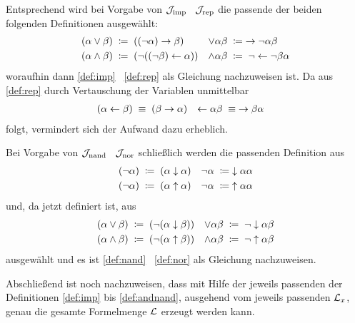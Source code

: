 Entsprechend wird bei Vorgabe von $\mathcal{J}_{\mathrm{imp}}$ \textbzgl\ $\mathcal{J}_{\mathrm{rep}}$ die passende der beiden folgenden Definitionen ausgewählt:
\begin{align}
	(\alpha \lor  \beta) & \;\coloneqq\; ((\lnot \alpha) \rightarrow \beta)         &
	\lor \alpha   \beta  & \;\coloneqq\;   \rightarrow \lnot \alpha \beta
	\label{def:orrep}
	\\
	(\alpha \land \beta) & \;\coloneqq\; (\lnot ((\lnot \beta) \leftarrow \alpha)) &
	\land \alpha  \beta  & \;\coloneqq\;  \lnot \leftarrow \lnot \beta \alpha
	\label{def:andrep}
\end{align}
woraufhin dann \eqref{def:imp} \textbzgl\ \eqref{def:rep} als Gleichung nachzuweisen ist.
Da aus \eqref{def:rep} durch Vertauschung der Variablen unmittelbar
\begin{align}
	(\alpha \leftarrow \beta) & \;\equiv\; (\beta \rightarrow \alpha) &
	\leftarrow \alpha  \beta  & \;\equiv\;  \rightarrow \beta \alpha  \label{eq:repimp}
\end{align}
folgt, vermindert sich der Aufwand dazu erheblich.

Bei Vorgabe von $\mathcal{J}_{\mathrm{nand}}$ \textbzgl\ $\mathcal{J}_{\mathrm{nor}}$ schließlich werden die passenden Definition aus
\begin{align}
	(\lnot \alpha) & \;\coloneqq\; (\alpha \downarrow \alpha)  &
	\lnot  \alpha  & \;\coloneqq\;  \downarrow \alpha \alpha   \label{def:notnor} \\
	(\lnot \alpha) & \;\coloneqq\; (\alpha \uparrow \alpha) &
	\lnot  \alpha  & \;\coloneqq\;  \uparrow \alpha \alpha  \label{def:notnand}
\end{align}
und, da \chrqt{$\lnot$} jetzt definiert ist, aus
\begin{align}
	(\alpha \lor \beta)  & \;\coloneqq\; (\lnot(\alpha \downarrow \beta))  &
	\lor \alpha  \beta   & \;\coloneqq\;  \lnot \downarrow \alpha \beta
	\label{def:ornor} \\
	(\alpha \land \beta) & \;\coloneqq\; (\lnot(\alpha \uparrow \beta)) &
	\land \alpha  \beta  & \;\coloneqq\;  \lnot \uparrow \alpha \beta
	\label{def:andnand}
\end{align}
ausgewählt und es ist \eqref{def:nand} \textbzgl\ \eqref{def:nor} als Gleichung nachzuweisen.

Abschließend ist noch nachzuweisen, dass mit Hilfe der jeweils passenden der Definitionen \eqref{def:imp} bis \eqref{def:andnand}, ausgehend vom jeweils passenden $\mathcal{L}_x$, genau die gesamte Formelmenge $\mathcal{L}$ erzeugt werden kann.

